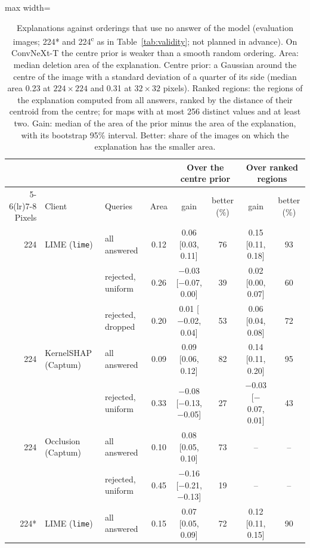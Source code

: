 \begin{table}
\centering\footnotesize\setlength{\tabcolsep}{3pt}
\caption{Explanations against orderings that use no answer of the model (evaluation images; 224* and 224\textsuperscript{c} as in Table~\ref{tab:validity}; not planned in advance). On ConvNeXt-T the centre prior is weaker than a smooth random ordering. Area: median deletion area of the explanation. Centre prior: a Gaussian around the centre of the image with a standard deviation of a quarter of its side (median area 0.23 at $224\times224$ and 0.31 at $32\times32$ pixels). Ranked regions: the regions of the explanation computed from all answers, ranked by the distance of their centroid from the centre; for maps with at most 256 distinct values and at least two. Gain: median of the area of the prior minus the area of the explanation, with its bootstrap 95\% interval. Better: share of the images on which the explanation has the smaller area.}
\label{tab:priors}
\vspace{3pt}
\begin{adjustbox}{max width=\textheight}
\begin{tabular}{rllccccc}
\toprule
& & & & \multicolumn{2}{c}{Over the centre prior} & \multicolumn{2}{c}{Over ranked regions} \\
\cmidrule(lr){5-6}\cmidrule(lr){7-8}
Pixels & Client & Queries & Area & gain & better (\%) & gain & better (\%) \\
\midrule
224 & LIME (\texttt{lime}) & all answered & 0.12 & 0.06 {[}0.03, 0.11{]} & 76 & 0.15 {[}0.11, 0.18{]} & 93 \\
 &  & rejected, uniform & 0.26 & $-$0.03 {[}$-$0.07, 0.00{]} & 39 & 0.02 {[}0.00, 0.07{]} & 60 \\
 &  & rejected, dropped & 0.20 & 0.01 {[}$-$0.02, 0.04{]} & 53 & 0.06 {[}0.04, 0.08{]} & 72 \\
224 & KernelSHAP (Captum) & all answered & 0.09 & 0.09 {[}0.06, 0.12{]} & 82 & 0.14 {[}0.11, 0.20{]} & 95 \\
 &  & rejected, uniform & 0.33 & $-$0.08 {[}$-$0.13, $-$0.05{]} & 27 & $-$0.03 {[}$-$0.07, 0.01{]} & 43 \\
224 & Occlusion (Captum) & all answered & 0.10 & 0.08 {[}0.05, 0.10{]} & 73 & -- & -- \\
 &  & rejected, uniform & 0.45 & $-$0.16 {[}$-$0.21, $-$0.13{]} & 19 & -- & -- \\[2pt]
224* & LIME (\texttt{lime}) & all answered & 0.15 & 0.07 {[}0.05, 0.09{]} & 72 & 0.12 {[}0.11, 0.15{]} & 90 \\

\end{tabular}
\end{adjustbox}
\end{table}
